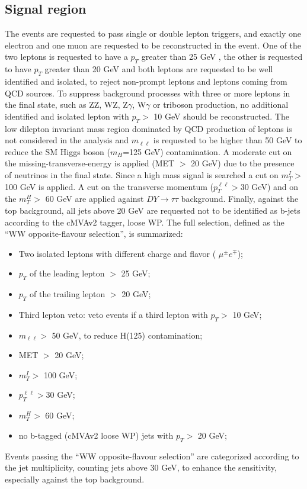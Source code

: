 \subsection*{Signal region}
The events are requested to pass single or double lepton triggers, and exactly one electron and
one muon are requested to be reconstructed in the event. 
One of the two leptons is requested to have a $p_T$ greater than 25 GeV , the other is
requested to have  $p_T$ greater than 20 GeV and both leptons are requested to be well identified
and isolated, to reject non-prompt leptons and leptons coming from QCD sources. To suppress
background processes with three or more leptons in the final state, such as ZZ, WZ, Z$\gamma$, W$\gamma$
or triboson production, no additional identified and isolated lepton with $p_T >$  10 GeV should
be reconstructed. The low dilepton invariant mass region dominated by QCD production of
leptons is not considered in the analysis and $m_{\ell \ell}$  is requested to
be higher than 50 GeV to reduce the SM Higgs boson ($m_H$=125 GeV)
contamination. A moderate cut on the missing-transverse-energy is applied (MET $>$ 20 GeV) due to the
presence of neutrinos in the final state. Since a high mass
signal is searched a cut on $m_T^I >$ 100 GeV is applied.
A cut on the transverse momentum ($p_T^{\ell \ell} >$30 GeV) and on the $m_T^H
>$ 60 GeV are applied against $DY\rightarrow{}\tau\tau$ background. 
Finally, against the top background, all jets above 20 GeV are requested not
to be identified as b-jets according to the cMVAv2 tagger, loose WP.
The full selection, defined as the ``WW opposite-flavour selection'', is summarized:

\begin{itemize}
\item Two isolated leptons with different charge and flavor ( $\mu^{\pm}
e^{\mp}$);
\item $p_T$ of the leading lepton $>$ 25 GeV;
\item $p_T$ of the trailing lepton $>$ 20 GeV;
\item Third lepton veto: veto events if a third lepton with $p_T  >$ 10 GeV;
\item  $m_{\ell \ell} >$ 50 GeV, to reduce H(125) contamination;
\item MET $>$ 20 GeV;
\item $m_T^I >$ 100 GeV;
\item $p_T^{\ell \ell} >$30 GeV;
\item  $m_T^H >$ 60 GeV;
\item  no b-tagged (cMVAv2 loose WP) jets with $p_T >$  20 GeV;
\end{itemize}
Events passing the ``WW opposite-flavour selection'' are categorized according to the jet
multiplicity, counting jets above 30 GeV, to enhance the sensitivity,
especially against the top background. 

